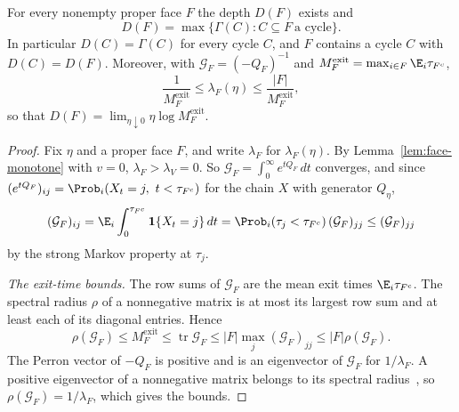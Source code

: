 \begin{theorem}\label{thm:depth}
For every nonempty proper face $F$ the depth $D(F)$ exists and
\[
 D(F)=\max\{\Gamma(C):C\subseteq F\ \text{a cycle}\}.
\]
In particular $D(C)=\Gamma(C)$ for every cycle $C$, and $F$ contains a cycle
$C$ with $D(C)=D(F)$. Moreover, with $\mathcal G_F=(-Q_F)^{-1}$ and
$M^{\mathrm{exit}}_F=\max_{i\in F}\E_i\tau_{F^c}$,
\[
 \frac1{M^{\mathrm{exit}}_F}\le \lambda_F(\eta)\le\frac{|F|}{M^{\mathrm{exit}}_F},
\]
so that $D(F)=\lim_{\eta\downarrow0}\eta\log M^{\mathrm{exit}}_F$.
\end{theorem}

\begin{proof}
Fix $\eta$ and a proper face $F$, and write $\lambda_F$ for $\lambda_F(\eta)$.
By Lemma~\ref{lem:face-monotone} with $v=0$, $\lambda_F>\lambda_V=0$. So
$\mathcal G_F=\int_0^\infty e^{tQ_F}\,dt$ converges, and since
$(e^{tQ_F})_{ij}=\Prob_i(X_t=j,\ t<\tau_{F^c})$ for the chain $X$ with
generator $Q_\eta$,
\[
 (\mathcal G_F)_{ij}=\E_i\int_0^{\tau_{F^c}}\mathbf 1\{X_t=j\}\,dt
 =\Prob_i(\tau_j<\tau_{F^c})\,(\mathcal G_F)_{jj}\le(\mathcal G_F)_{jj}
\]
by the strong Markov property at $\tau_j$.

\emph{The exit-time bounds.} The row sums of $\mathcal G_F$ are the mean exit
times $\E_i\tau_{F^c}$. The spectral radius $\rho$ of a nonnegative matrix is at
most its largest row sum and at least each of its diagonal entries. Hence
\[
 \rho(\mathcal G_F)\le M^{\mathrm{exit}}_F\le\operatorname{tr}\mathcal G_F
 \le|F|\max_j(\mathcal G_F)_{jj}\le|F|\rho(\mathcal G_F).
\]
The Perron vector of $-Q_F$ is positive and is an eigenvector of
$\mathcal G_F$ for $1/\lambda_F$. A positive eigenvector of a nonnegative
matrix belongs to its spectral radius~\cite{bermanplemmons1994}, so
$\rho(\mathcal G_F)=1/\lambda_F$, which gives the bounds.


\end{proof}

